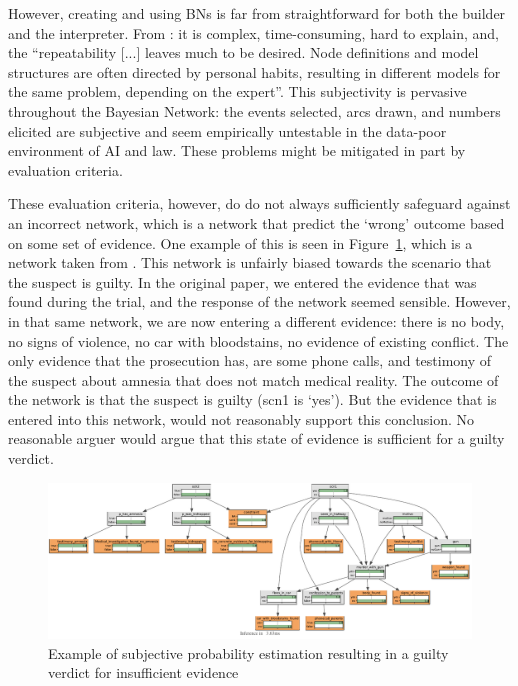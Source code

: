 \documentclass[11pt]{article}
\begin{document}
However, creating and using BNs is far from straightforward for both the builder and the interpreter. From \citet{deKoeijer2020}: it is complex, time-consuming, hard to explain, and, the ``repeatability [...] leaves much to be desired. Node definitions and model structures are often directed by personal habits, resulting in different models for the same problem, depending on the expert''. This subjectivity is pervasive throughout the Bayesian Network: the events selected, arcs drawn, and numbers elicited are subjective and seem empirically untestable in the data-poor environment of AI and law. These problems might be mitigated in part by evaluation criteria. 

These evaluation criteria, however, do do not always sufficiently safeguard against an incorrect network, which is a network that predict the `wrong' outcome based on some set of evidence. One example of this is seen in Figure~\ref{love}, which is a network taken from \citet{vanLeeuwen2019}. This network is unfairly biased towards the scenario that the suspect is guilty. In the original paper, we entered the evidence that was found during the trial, and the response of the network seemed sensible. However, in that same network, we are now entering a different evidence: there is no body, no signs of violence, no car with bloodstains, no evidence of existing conflict. The only evidence that the prosecution has, are some phone calls, and  testimony of the suspect about amnesia that does not match medical reality. The outcome of the network is that the suspect is guilty (scn1 is `yes'). But the evidence that is entered into this network, would not reasonably support this conclusion. No reasonable arguer would argue that this state of evidence is sufficient for a guilty verdict.

\begin{figure}[htbp]
\includegraphics[width=\linewidth]{images/oldnetwork.pdf}
\caption{Example of subjective probability estimation resulting in a guilty verdict for insufficient evidence}
\label{love}
\end{figure}%
\end{document}
